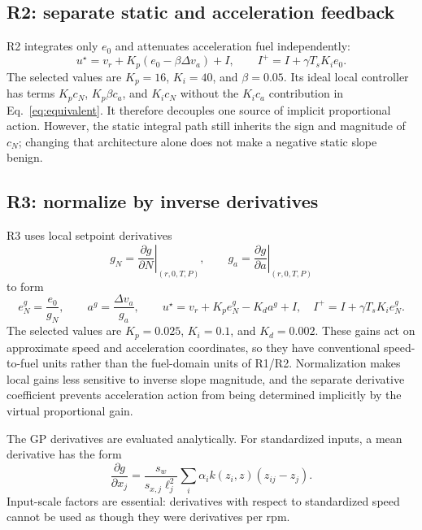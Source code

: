 \subsection{R2: separate static and acceleration feedback}
R2 integrates only $e_0$ and attenuates acceleration fuel independently:
\begin{equation}
u^\star=v_r+K_p(e_0-\beta\Delta v_a)+I,\qquad
I^+=I+\gamma T_sK_ie_0.
\end{equation}
The selected values are $K_p=16$, $K_i=40$, and $\beta=0.05$. Its ideal local controller has terms $K_pc_N$, $K_p\beta c_a$, and $K_ic_N$ without the $K_ic_a$ contribution in Eq.~\eqref{eq:equivalent}. It therefore decouples one source of implicit proportional action. However, the static integral path still inherits the sign and magnitude of $c_N$; changing that architecture alone does not make a negative static slope benign.

\subsection{R3: normalize by inverse derivatives}
R3 uses local setpoint derivatives
\begin{equation}
g_N=\left.\frac{\partial g}{\partial N}\right|_{(r,0,T,P)},\qquad
g_a=\left.\frac{\partial g}{\partial a}\right|_{(r,0,T,P)}
\end{equation}
to form
\begin{equation}
e_N^g=\frac{e_0}{g_N},\qquad a^g=\frac{\Delta v_a}{g_a},\qquad
u^\star=v_r+K_pe_N^g-K_da^g+I,
\quad I^+=I+\gamma T_sK_ie_N^g.
\label{eq:r3}
\end{equation}
The selected values are $K_p=0.025$, $K_i=0.1$, and $K_d=0.002$. These gains act on approximate speed and acceleration coordinates, so they have conventional speed-to-fuel units rather than the fuel-domain units of R1/R2. Normalization makes local gains less sensitive to inverse slope magnitude, and the separate derivative coefficient prevents acceleration action from being determined implicitly by the virtual proportional gain.

The GP derivatives are evaluated analytically. For standardized inputs, a mean derivative has the form
\begin{equation}
\frac{\partial g}{\partial x_j}
=\frac{s_w}{s_{x,j}\ell_j^2}\sum_i\alpha_i k(z_i,z)(z_{ij}-z_j).
\end{equation}
Input-scale factors are essential: derivatives with respect to standardized speed cannot be used as though they were derivatives per rpm.

